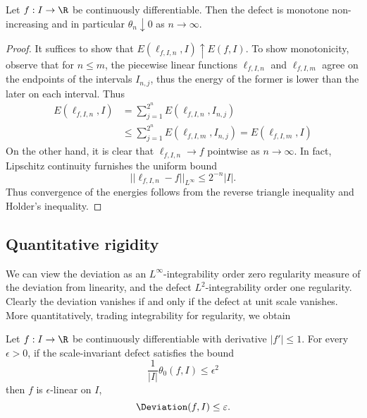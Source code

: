 \begin{lemma}
	Let $f: I \to \R$ be continuously differentiable. Then the defect is monotone non-increasing and in particular $\theta_n \downarrow 0$ as $n \to \infty$. 
\end{lemma}	 

\begin{proof}
	It suffices to show that $E(\ell_{f, I, n}, I) \uparrow E(f, I)$. To show monotonicity, observe that for $n \leq m$, the piecewise linear functions $\ell_{f, I, n}$ and $\ell_{f, I, m}$ agree on the endpoints of the intervals $I_{n, j}$, thus the energy of the former is lower than the later on each interval. Thus
		\begin{align*}
			E(\ell_{f, I, n}, I) 
				&= \sum_{j = 1}^{2^n} E(\ell_{f, I, n}, I_{n, j}) \\
				&\leq \sum_{j = 1}^{2^n}E(\ell_{f, I, m}, I_{n, j}) = E(\ell_{f, I, m}, I)
		\end{align*}	
	On the other hand, it is clear that $\ell_{f, I, n} \to f$ pointwise as $n \to \infty$. In fact, Lipschitz continuity furnishes the uniform bound
		\[ ||\ell_{f, I, n} - f||_{L^\infty} \leq 2^{-n} |I|. \]
	Thus convergence of the energies follows from the reverse triangle inequality and Holder's inequality. 
\end{proof}

\subsection{Quantitative rigidity}

We can view the deviation as an $L^\infty$-integrability order zero regularity measure of the deviation from linearity, and the defect $L^2$-integrability order one regularity. Clearly the deviation vanishes if and only if the defect at unit scale vanishes. More quantitatively, trading integrability for regularity, we obtain 

\begin{lemma}
	Let $f: I \to \R$ be continuously differentiable with derivative $|f'| \leq 1$. For every $\epsilon > 0$, if the scale-invariant defect satisfies the bound
		\[ \frac{1}{|I|} \theta_0 (f, I) \leq \epsilon^2 \]
	then $f$ is $\epsilon$-linear on $I$, 
		\[ \Deviation(f, I) \leq \epsilon. \]
\end{lemma}

